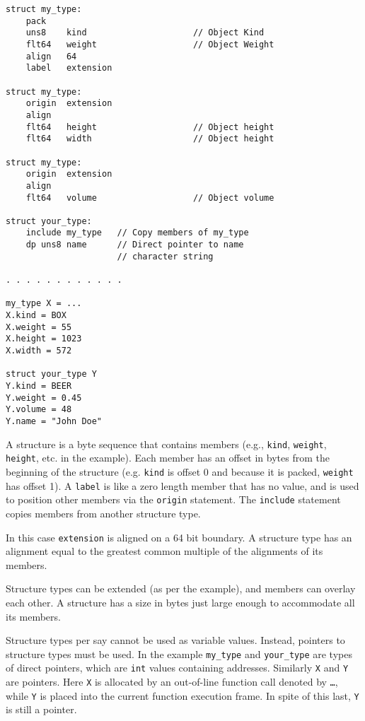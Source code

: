 \documentclass[12pt]{article}
\newenvironment{indpar}[1][0.3in]%
	{\begin{list}{}%
		     {\setlength{\itemsep}{0in}%
		      \setlength{\topsep}{0in}%
		      \setlength{\parsep}{1ex}%
		      \setlength{\labelwidth}{#1}%
		      \setlength{\leftmargin}{#1}%
		      \addtolength{\leftmargin}{\labelsep}}%
	 \item}%
	{\end{list}}
\begin{document}
\begin{indpar}\begin{verbatim}
struct my_type:
    pack
    uns8    kind                     // Object Kind
    flt64   weight                   // Object Weight
    align   64
    label   extension

struct my_type:
    origin  extension
    align
    flt64   height                   // Object height
    flt64   width                    // Object height

struct my_type:
    origin  extension
    align
    flt64   volume                   // Object volume

struct your_type:
    include my_type   // Copy members of my_type
    dp uns8 name      // Direct pointer to name
                      // character string

. . . . . . . . . . . .

my_type X = ...
X.kind = BOX
X.weight = 55
X.height = 1023
X.width = 572

struct your_type Y
Y.kind = BEER
Y.weight = 0.45
Y.volume = 48
Y.name = "John Doe"
\end{verbatim}\end{indpar}

A structure is a byte sequence that contains members
(e.g., {\tt kind}, {\tt weight}, {\tt height}, etc. in
the example).
Each member has an offset in bytes from the beginning of the
structure (e.g. {\tt kind} is offset 0 and because it is
packed, {\tt weight} has offset 1).  A {\tt label} is like
a zero length member that has no value, and is used to
position other members via the {\tt origin} statement.
The {\tt include} statement copies members from another
structure type.

In this case {\tt extension} is aligned on a 64 bit boundary.
A structure type has an
alignment equal to the greatest common multiple of the
alignments of its members.

Structure types can be extended
(as per the example), and members can overlay each other.
A structure has a size in bytes just large enough to
accommodate all its members.

Structure types per say cannot be used as variable values.
Instead, pointers to structure types must be used.  In the
example {\tt my\_type} and {\tt your\_type} are types of
direct pointers, which are {\tt int} values containing
addresses.  Similarly {\tt X} and {\tt Y} are pointers.
Here {\tt X} is allocated by an out-of-line function call
denoted by {\tt \ldots}, while {\tt Y} is placed into the
current function execution frame.  In spite of this last,
{\tt Y} is still a pointer.
\end{document}
